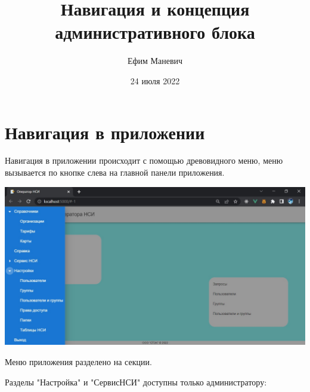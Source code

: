 \documentclass[12pt, a4paper]{article}
\title{Навигация и концепция административного блока}
\author{Ефим Маневич}
\date{24 июля 2022}
\begin{document}
\maketitle

\section{Навигация в приложении}

Навигация в приложении происходит с помощью древовидного меню, меню вызывается по кнопке слева на
главной панели приложения. 

\begin{center}
    \includegraphics [width=\textwidth] {p1.png}
\end{center}

Меню приложения разделено на секции. 

Разделы "Настройка" и "СервисНСИ" доступны только администратору:
\end{document}
